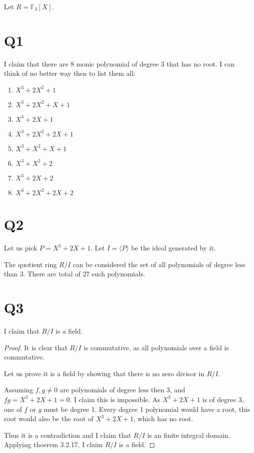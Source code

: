 \documentclass[12pt, a4paper]{article}
\theoremstyle{definition}
\theoremstyle{remark}
\begin{document}
Let $R = \mathbb{F}_3[X]$.

\section{Q1}

I claim that there are 8 monic polynomial of degree 3 that has no root.
I can think of no better way then to list them all:
\begin{enumerate}
	\item $X^3+2X^2+1$
	\item $X^3 + 2X^2+ X+1$
	\item $X^3+2X+1$
	\item $X^3+2X^2+2X+1$
	\item $X^3+X^2+X+1$
	\item $X^3+X^2+2$
	\item $X^3+2X+2$
	\item $X^3+2X^2+2X+2$
\end{enumerate}

\section{Q2}

Let us pick $P = X^3+2X+1$. Let $I = \langle P \rangle$ be the ideal generated by it.

The quotient ring $R/I$ can be considered the set of all polynomials of degree less than 3. There are total of 27 such polynomials.

\section{Q3}

I claim that $R/I$ is a field.

\begin{proof}
	It is clear that $R/I$ is commutative, as all polynomials over a field is commutative.

	Let us prove it is a field by showing that there is no zero divisor in $R/I$.
	
	Assuming $f,g \neq 0$ are polynomials of degree less then 3, and $fg = X^3+2X+1 = 0$.  
	I claim this is impossible. As $X^3+2X+1$ is of degree 3, one of $f$ or $g$ must be degree 1. 
	Every degree 1 polynomial would have a root, this root would also be the root of $X^3+2X+1$, which has no root.

	Thus it is a contradiction and I claim that $R/I$ is an finite integral domain.
	Applying thoerem 3.2.17, I claim $R/I$ is a field.
\end{proof}
\end{document}
